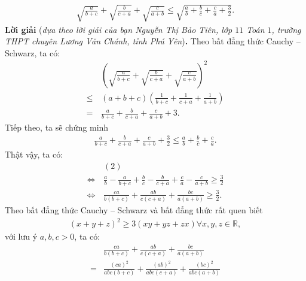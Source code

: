 \begin{multicols}{2}
\begin{align*}
		\sqrt{\!\!\frac{a}{b\!+\!c}}\!+\!\sqrt{\!\!\frac{b}{c\!+\!a}}\!+\!\sqrt{\!\!\frac{c}{a\!+\!b}}
		\!\leq\! \sqrt{\!\!\frac{a}{b}\!+\!\frac{b}{c}\!+\!\frac{c}{a}\!+\!\frac{3}{2}} .
	\end{align*}
	\textbf{\color{thachthuctoanhoc}Lời giải} (\textit{dựa theo lời giải của bạn Nguyễn Thị Bảo Tiên, lớp $11$ Toán $1$, trường THPT chuyên Lương Văn Chánh, tỉnh Phú Yên})\textbf{\color{thachthuctoanhoc}.}
	\vskip 0.05cm
	Theo bất đẳng thức Cauchy -- Schwarz, ta có:
	\begin{align*}
		&{\left( {\sqrt {\frac{a}{{b + c}}}  + \sqrt {\frac{b}{{c + a}}}  + \sqrt {\frac{c}{{a + b}}} } \right)^2} \\
		\le \,&(a + b + c)\left( {\frac{1}{{b + c}} + \frac{1}{{c + a}} + \frac{1}{{a + b}}} \right) \\
		= \,&\frac{a}{{b + c}} + \frac{b}{{c + a}} + \frac{c}{{a + b}} + 3. \tag{$1$}
	\end{align*}
	Tiếp theo, ta sẽ chứng minh
	\begin{align*}
		\frac{a}{{b + c}} + \frac{b}{{c + a}} + \frac{c}{{a + b}} + \frac{3}{2} \le \frac{a}{b} + \frac{b}{c} + \frac{c}{a}.
	\end{align*}
	Thật vậy, ta có:
	\begin{align*}
		&(2) \\
		\Leftrightarrow \,&\frac{a}{b} \!-\! \frac{a}{{b \!+\! c}} \!+\! \frac{b}{c} \!-\! \frac{b}{{c \!+\! a}} \!+\! \frac{c}{a} \!-\! \frac{c}{{a \!+\! b}} \!\ge\! \frac{3}{2}\\
		\Leftrightarrow \,&\frac{{ca}}{{b\left( {b \!+\! c} \right)}} \!+\! \frac{{ab}}{{c\left( {c \!+\! a} \right)}} \!+\! \frac{{bc}}{{a\left( {a \!+\! b} \right)}} \!\ge\! \frac{3}{2}.\! \tag{$3$}
	\end{align*}
	Theo bất đẳng thức Cauchy -- Schwarz và bất đẳng thức rất quen biết
	\begin{align*}
		{\left( {x + y + z} \right)^2} \ge 3\left( {xy + yz + zx} \right)\forall x,y,z \in  \mathbb{R},
	\end{align*}
	với lưu ý $a, b, c > 0$, ta có:
	\begin{align*}
			&\frac{{ca}}{{b\left( {b + c} \right)}} + \frac{{ab}}{{c\left( {c + a} \right)}} + \frac{{bc}}{{a\left( {a + b} \right)}} \\
			= &\frac{{{{\left( {ca} \right)}^2}}}{{abc\left( {b + c} \right)}} + \frac{{{{\left( {ab} \right)}^2}}}{{abc\left( {c + a} \right)}} + \frac{{{{\left( {bc} \right)}^2}}}{{abc\left( {a + b} \right)}}\\

\end{align*}
\end{multicols}
